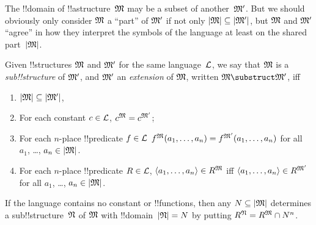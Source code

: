 \documentclass[../../../include/open-logic-section]{subfiles}
\begin{document}

The !!{domain} of !!a{structure}~$\mathfrak M$ may be a subset of
another~$\mathfrak M'$.  But we should obviously only consider
$\mathfrak M$ a ``part'' of $\mathfrak M'$ if not only $\left| \mathfrak M \right|
\subseteq \left| \mathfrak M' \right|$, but $\mathfrak M$ and $\mathfrak M'$ ``agree''
in how they interpret the symbols of the language at least on the
shared part~$\left| \mathfrak M \right|$.

\begin{defn}
Given !!{structure}s $\mathfrak M$ and $\mathfrak M'$ for the same
language~$\mathcal L$, we say that $\mathfrak M$ is a \emph{sub!!{structure}}
of $\mathfrak M'$, and $\mathfrak M'$ an \emph{extension} of $\mathfrak M$,
written $\Struct M \substruct \Struct M'$, iff
\begin{enumerate}
\item $\left| \mathfrak M \right| \subseteq \left| \mathfrak M' \right|$,
\item For each constant $c \in \mathcal L$, $c^{\mathfrak M} =
    c^{\mathfrak M'}$;
\item For each $n$-place !!{predicate} $f \in \mathcal L$
  $f^{\mathfrak M}(a_1, \dots, a_n) = f^{\mathfrak M'}(a_1, \dots, a_n)$
  for all $a_1$, \dots, $a_n \in \left| \mathfrak M \right|$.
\item For each $n$-place !!{predicate} $R \in \mathcal L$, $\langle
  a_1, \dots, a_n\rangle \in R^{\mathfrak M}$ iff $\langle a_1, \dots,
  a_n\rangle \in R^{\mathfrak M'}$ for all $a_1$, \dots, $a_n \in
  \left| \mathfrak M \right|$.
\end{enumerate}
\end{defn}

\begin{rem}
If the language contains no constant or !!{function}s, then any $N
\subseteq \left| \mathfrak M \right|$ determines a sub!!{structure}~$\mathfrak N$ of
$\mathfrak M$ with !!{domain}~$\left| \mathfrak N \right| = N$ by putting $R^{\mathfrak N} =
R^{\mathfrak M} \cap N^n$.
\end{rem}

\end{document}
